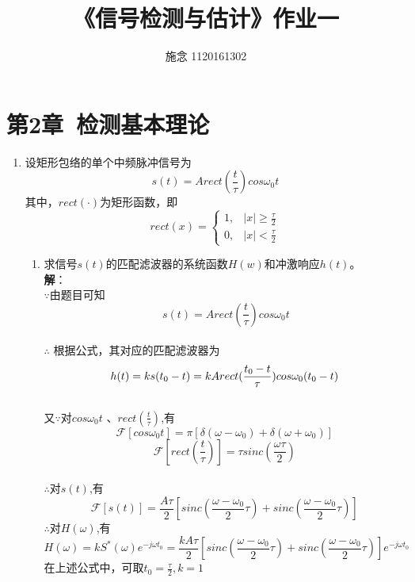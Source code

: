 \documentclass{article}
\begin{document}
\title{《信号检测与估计》作业一}
\author{施念  1120161302}
\maketitle{}
\section{第2章\ 检测基本理论}
\begin{enumerate}[1.]
\item 
设矩形包络的单个中频脉冲信号为$$s(t)=Arect(\frac{t}{\tau})cos\omega_{0}t$$其中，$rect(\cdot)$为矩形函数，即
$$rect(x)=
	\begin{cases}
	1,& |x|\ge \frac{\tau}{2}\\
	0,& |x|<\frac{\tau}{2}
	\end{cases} 
$$

\begin{enumerate}[(1)]
\item 求信号$s(t)$的匹配滤波器的系统函数$H(w)$和冲激响应$h(t)$。\\
\textbf{解}：\\
$\because$由题目可知\[\ s(t)=Arect(\frac{t}{\tau})cos\omega_{0}t\]\\
$\therefore$ 根据公式，其对应的匹配滤波器为$$h(t)=ks(t_{0}-t)\\ = kArect(\frac{t_{0}-t}{\tau})cos\omega_{0}(t_{0}-t)$$\\
又\(\because\)对\(cos\omega_{0}t\) 、\(rect(\frac{t}{\tau})\),有
	\[\mathscr{F}[cos\omega_{0}t]=\pi[\delta(\omega-\omega_{0})+\delta(\omega+\omega_{0})]\]
	\[\mathscr{F}[rect(\frac{t}{\tau})]=\tau sinc(\frac{\omega\tau}{2})\]\\
\(\therefore\)对\(s(t)\),有
	\[\mathscr{F}[ s(t) ]= \frac{A\tau}{2} [sinc(\frac{\omega-\omega_{0}}{2}\tau)+sinc(\frac{\omega-\omega_{0}}{2}\tau) ] \]
	\(\therefore\)对\(H(\omega)\),有
$$
H(\omega)= kS^{*}(\omega)e^{-j\omega t_{0}}
	=\frac{kA\tau}{2}[sinc(\frac{\omega-\omega_{0}}{2}\tau)+sinc(\frac{\omega-\omega_{0}}{2}\tau) ]e^{-j\omega t_{0}}
$$
在上述公式中，可取\(t_{0}=\frac{\tau}{2},k=1\)\\


		 
		 

\end{enumerate}
\end{enumerate}
\end{document}
